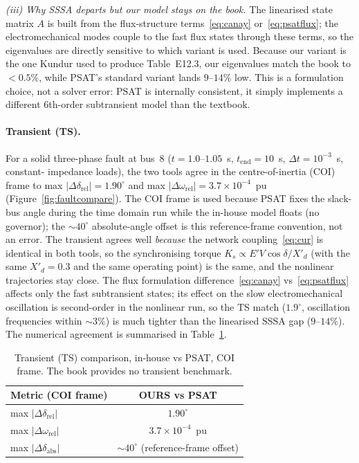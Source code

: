 \documentclass[12pt,a4paper]{article}
\begin{document}
\emph{(iii) Why SSSA departs but our model stays on the book.} The linearised
state matrix $A$ is built from the flux-structure terms~\eqref{eq:canay}
or~\eqref{eq:psatflux}; the electromechanical modes couple to the fast flux
states through these terms, so the eigenvalues are directly sensitive to which
variant is used. Because our variant is the one Kundur used to produce
Table~E12.3, our eigenvalues match the book to $<0.5\%$, while PSAT's standard
variant lands $9$--$14\%$ low. This is a formulation choice, not a solver
error: PSAT is internally consistent, it simply implements a different
6th-order subtransient model than the textbook.

\paragraph{Transient (TS).} For a solid three-phase fault at bus~8
($t=1.0$--$1.05$~s, $t_{\mathrm{end}}=10$~s, $\Delta t=10^{-3}$~s, constant-
impedance loads), the two tools agree in the centre-of-inertia (COI) frame to
max $|\Delta\delta_{\mathrm{rel}}|=1.90^\circ$ and max $|\Delta\omega_{\mathrm{rel}}|=3.7\times10^{-4}$~pu
(Figure~\ref{fig:faultcompare}). The COI frame is used because PSAT fixes the
slack-bus angle during the time domain run while the in-house model floats
(no governor); the $\sim40^\circ$ absolute-angle offset is this reference-frame
convention, not an error. The transient agrees well \emph{because} the network
coupling~\eqref{eq:cur} is identical in both tools, so the synchronising torque
$K_s\propto E'V\cos\delta/X'_d$ (with the same $X'_d=0.3$ and the same operating
point) is the same, and the nonlinear trajectories stay close. The flux
formulation difference~\eqref{eq:canay} vs~\eqref{eq:psatflux} affects only
the fast subtransient states; its effect on the slow electromechanical
oscillation is second-order in the nonlinear run, so the TS match ($1.9^\circ$,
oscillation frequencies within $\sim3\%$) is much tighter than the linearised
SSSA gap ($9$--$14\%$). The numerical agreement is summarised in
Table~\ref{tab:ts3way}.

\begin{table}[H]
\centering
\caption{Transient (TS) comparison, in-house vs PSAT, COI frame. The book
provides no transient benchmark.}
\label{tab:ts3way}
\footnotesize
\begin{tabular}{l c}
\toprule
Metric (COI frame) & OURS vs PSAT \\
\midrule
max $|\Delta\delta_{\mathrm{rel}}|$ & $1.90^\circ$ \\
max $|\Delta\omega_{\mathrm{rel}}|$ & $3.7\times10^{-4}$~pu \\
max $|\Delta\delta_{\mathrm{abs}}|$ & $\sim40^\circ$ (reference-frame offset) \\
\bottomrule
\end{tabular}
\end{table}
\end{document}
